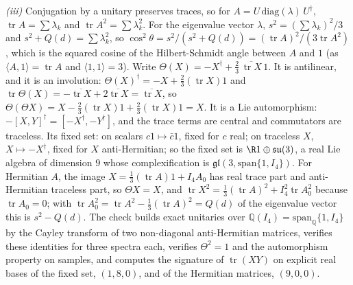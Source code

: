 \emph{(iii)} Conjugation by a unitary preserves traces, so for $A = U\,\mathrm{diag}(\lambda)\,U^{\dagger}$, $\operatorname{tr}A = \sum\lambda_{k}$ and $\operatorname{tr}A^{2} = \sum\lambda_{k}^{2}$. For the eigenvalue vector $\lambda$, $s^{2} = (\sum\lambda_{k})^{2}/3$ and $s^{2} + Q(d) = \sum\lambda_{k}^{2}$, so $\cos^{2}\theta = s^{2}/(s^{2} + Q(d)) = (\operatorname{tr}A)^{2}/(3\operatorname{tr}A^{2})$, which is the squared cosine of the Hilbert-Schmidt angle between $A$ and $1$ (as $\langle A, 1\rangle = \operatorname{tr}A$ and $\langle 1, 1\rangle = 3$). Write $\Theta(X) = -X^{\dagger} + \tfrac23\,\overline{\operatorname{tr}X}\,1$. It is antilinear, and it is an involution: $\Theta(X)^{\dagger} = -X + \tfrac23(\operatorname{tr}X)1$ and $\operatorname{tr}\Theta(X) = -\overline{\operatorname{tr}X} + 2\overline{\operatorname{tr}X} = \overline{\operatorname{tr}X}$, so $\Theta(\Theta X) = X - \tfrac23(\operatorname{tr}X)1 + \tfrac23(\operatorname{tr}X)1 = X$. It is a Lie automorphism: $-[X,Y]^{\dagger} = [-X^{\dagger}, -Y^{\dagger}]$, and the trace terms are central and commutators are traceless. Its fixed set: on scalars $c1 \mapsto \bar{c}1$, fixed for $c$ real; on traceless $X$, $X \mapsto -X^{\dagger}$, fixed for $X$ anti-Hermitian; so the fixed set is $\R 1 \oplus \mathfrak{su}(3)$, a real Lie algebra of dimension $9$ whose complexification is $\mathfrak{gl}(3, \mathrm{span}\{1, I_4\})$. For Hermitian $A$, the image $X = \tfrac13(\operatorname{tr}A)1 + I_4 A_{0}$ has real trace part and anti-Hermitian traceless part, so $\Theta X = X$, and $\operatorname{tr}X^{2} = \tfrac13(\operatorname{tr}A)^{2} + I_4^{2}\operatorname{tr}A_{0}^{2}$ because $\operatorname{tr}A_{0} = 0$; with $\operatorname{tr}A_{0}^{2} = \operatorname{tr}A^{2} - \tfrac13(\operatorname{tr}A)^{2} = Q(d)$ of the eigenvalue vector this is $s^{2} - Q(d)$. The check builds exact unitaries over $\mathbb{Q}(I_4) = \mathrm{span}_{\mathbb{Q}}\{1, I_4\}$ by the Cayley transform of two non-diagonal anti-Hermitian matrices, verifies these identities for three spectra each, verifies $\Theta^{2} = 1$ and the automorphism property on samples, and computes the signature of $\operatorname{tr}(XY)$ on explicit real bases of the fixed set, $(1,8,0)$, and of the Hermitian matrices, $(9,0,0)$.

